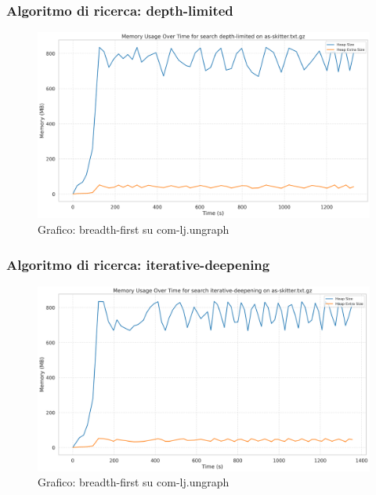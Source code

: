 \documentclass{article}
\begin{document}
\subsubsection{Algoritmo di ricerca: depth-limited}
\begin{figure}[htbp]\centering
\includegraphics[width=\textwidth]{../plots/as-skitter_depth-limited.png}
\caption{Grafico: breadth-first su com-lj.ungraph}
\end{figure}
\subsubsection{Algoritmo di ricerca: iterative-deepening}
\begin{figure}[htbp]\centering
\includegraphics[width=\textwidth]{../plots/as-skitter_iterative-deepening.png}
\caption{Grafico: breadth-first su com-lj.ungraph}
\end{figure}
\end{document}
